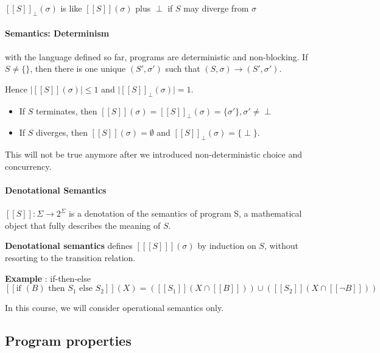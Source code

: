 \documentclass[12pt, a4paper]{book}
\begin{document}
${[[S]]}_{\perp}(\sigma)$ is like $[[S]](\sigma)$ plus $\perp$ if $S$ may
diverge from $\sigma$

\paragraph{Semantics: Determinism}

with the language defined so far, programs are deterministic and non-blocking.
If $S \neq \{ \}$, then there is one unique $(S',\sigma')$ such that
$(S,\sigma) \longrightarrow (S', \sigma')$. \newline

Hence $\lvert [[S]](\sigma) \rvert \le 1$ and $\lvert {[[S]]}_{\perp}(\sigma) \rvert = 1$. \\
\begin{itemize}
    \item If $S$ terminates, then
    $[[S]](\sigma) = {[[S]]}_{\perp}(\sigma) = \{\sigma'\}, \sigma' \neq \perp$
    \item If $S$ diverges, then $[[S]](\sigma) = \emptyset$ and
    ${[[S]]}_{\perp}(\sigma) = \{\perp\}$.
\end{itemize}

This will not be true anymore after we introduced non-deterministic choice and
concurrency.

\paragraph{Denotational Semantics}

$[[S]] : \Sigma \rightarrow 2^{\Sigma}$ is a denotation of the semantics of
program S, a mathematical object that fully describes the meaning of $S$.

\textbf{Denotational semantics} defines $[[[S]]](\sigma)$ by induction on $S$,
without resorting to the transition relation.

\begin{framed}
    \textbf{Example} : if-then-else
    $$
    [[\textrm{if } (B) \textrm{ then } S_{1} \textrm{ else } S_{2}]](X) =
    ([[S_{1}]] (X \cap [[B]])) \cup ([[S_{2}]] ( X \cap [[\lnot B]] ))
    $$
\end{framed}

In this course, we will consider operational semantics only.

\subsection{Program properties}
\label{sub:Program properties}
\end{document}
